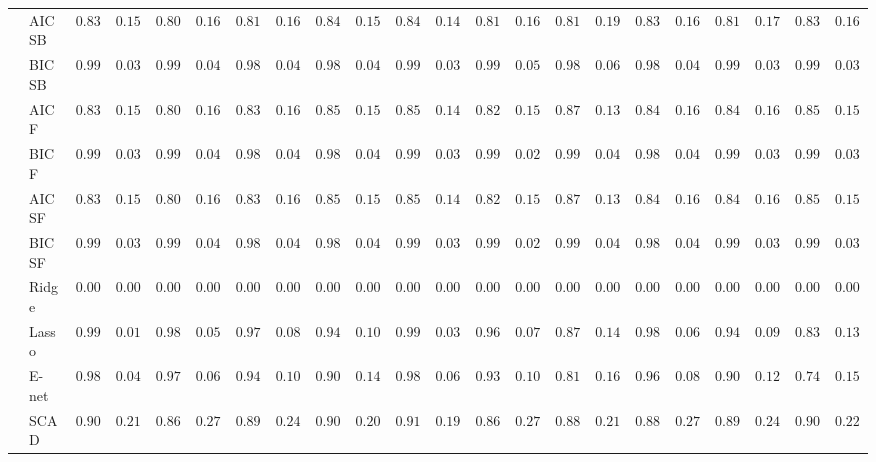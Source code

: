 \begin{tabular}{ll|ll|llllll|llllll|llllll}
	& AIC SB  & $0.8317$ & $0.1526$ & $0.8033$ & $0.1698$ & $0.8167$ & $0.1683$ & $0.8467$ & $0.1583$ & $0.8467$ & $0.1473$ & $0.8100$ & $0.1675$ & $0.8183$ & $0.1926$ & $0.8383$ & $0.1666$ & $0.8183$ & $0.1726$ & $0.8300$ & $0.1624$ \\
	& BIC SB  & $0.9917$ & $0.0365$ & $0.9900$ & $0.0463$ & $0.9883$ & $0.0489$ & $0.9867$ & $0.0454$ & $0.9900$ & $0.0398$ & $0.9900$ & $0.0571$ & $0.9850$ & $0.0631$ & $0.9883$ & $0.0489$ & $0.9917$ & $0.0365$ & $0.9917$ & $0.0365$ \\
	& AIC F  & $0.8317$ & $0.1526$ & $0.8033$ & $0.1698$ & $0.8333$ & $0.1658$ & $0.8533$ & $0.1503$ & $0.8500$ & $0.1431$ & $0.8233$ & $0.1514$ & $0.8717$ & $0.1399$ & $0.8417$ & $0.1665$ & $0.8400$ & $0.1640$ & $0.8550$ & $0.1529$ \\
	& BIC F  & $0.9917$ & $0.0365$ & $0.9900$ & $0.0463$ & $0.9883$ & $0.0489$ & $0.9867$ & $0.0454$ & $0.9900$ & $0.0398$ & $0.9950$ & $0.0286$ & $0.9917$ & $0.0435$ & $0.9883$ & $0.0489$ & $0.9917$ & $0.0365$ & $0.9917$ & $0.0365$ \\
	& AIC SF  & $0.8317$ & $0.1526$ & $0.8033$ & $0.1698$ & $0.8333$ & $0.1658$ & $0.8533$ & $0.1503$ & $0.8500$ & $0.1431$ & $0.8233$ & $0.1514$ & $0.8717$ & $0.1399$ & $0.8417$ & $0.1665$ & $0.8400$ & $0.1640$ & $0.8550$ & $0.1529$ \\
	& BIC SF  & $0.9917$ & $0.0365$ & $0.9900$ & $0.0463$ & $0.9883$ & $0.0489$ & $0.9867$ & $0.0454$ & $0.9900$ & $0.0398$ & $0.9950$ & $0.0286$ & $0.9917$ & $0.0435$ & $0.9883$ & $0.0489$ & $0.9917$ & $0.0365$ & $0.9917$ & $0.0365$ \\
	& Ridge  & $0.0000$ & $0.0000$ & $0.0000$ & $0.0000$ & $0.0000$ & $0.0000$ & $0.0000$ & $0.0000$ & $0.0000$ & $0.0000$ & $0.0000$ & $0.0000$ & $0.0000$ & $0.0000$ & $0.0000$ & $0.0000$ & $0.0000$ & $0.0000$ & $0.0000$ & $0.0000$ \\
	& Lasso  & $0.9983$ & $0.0167$ & $0.9850$ & $0.0535$ & $0.9733$ & $0.0811$ & $0.9467$ & $0.1056$ & $0.9917$ & $0.0365$ & $0.9683$ & $0.0738$ & $0.8717$ & $0.1457$ & $0.9800$ & $0.0682$ & $0.9467$ & $0.0914$ & $0.8300$ & $0.1381$ \\
	& E-net  & $0.9883$ & $0.0427$ & $0.9717$ & $0.0672$ & $0.9467$ & $0.1082$ & $0.9017$ & $0.1403$ & $0.9867$ & $0.0612$ & $0.9333$ & $0.1086$ & $0.8150$ & $0.1605$ & $0.9683$ & $0.0877$ & $0.9017$ & $0.1256$ & $0.7400$ & $0.1523$ \\
	& SCAD  & $0.9000$ & $0.2145$ & $0.8617$ & $0.2783$ & $0.8917$ & $0.2409$ & $0.9083$ & $0.2043$ & $0.9133$ & $0.1931$ & $0.8617$ & $0.2763$ & $0.8883$ & $0.2159$ & $0.8850$ & $0.2749$ & $0.8900$ & $0.2498$ & $0.9033$ & $0.2250$ \\

\end{tabular}
